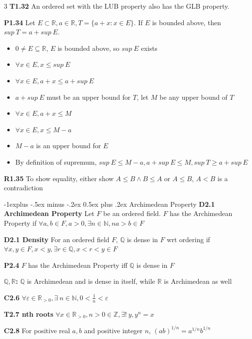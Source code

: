 \documentclass[10pt, landscape]{article}
\makeatletter
\renewcommand{\section}{\@startsection{section}{1}{0mm}%
                                {-1ex plus -.5ex minus -.2ex}%
                                {0.5ex plus .2ex}%
                                {\normalfont\large\bfseries}}
\renewcommand{\section}{\@startsection{section}{2}{0mm}%
                                {-1explus -.5ex minus -.2ex}%
                                {0.5ex plus .2ex}%
                                {\normalfont\normalsize\bfseries}}
\makeatother
\begin{document}
\begin{multicols*}{3}
\textbf{T1.32} An ordered set with the LUB property also has the GLB property.

\textbf{P1.34} Let $E \subset \mathbb{R}, a \in \mathbb{R}, T=\{a+x:x\in E\}$. If $E$ is bounded above, then $sup\ T=a+sup\ E$.
\begin{itemize}
    \item $0 \neq E \subseteq \mathbb{R}$, $E$ is bounded above, so $sup\ E$ exists
    \item $\forall x \in E, x \leq sup\ E$
    \item $\forall x \in E, a+x \leq a + sup\ E$
    \item $a+sup\ E$ must be an upper bound for $T$, let $M$ be any upper bound of $T$
    \item $\forall x \in E, a+x \leq M$
    \item $\forall x \in E, x \leq M-a$
    \item $M-a$ is an upper bound for $E$
    \item By definition of supremum, $sup\ E \leq M-a, a+sup\ E \leq M, sup\ T \geq a + sup\ E$
\end{itemize}

\textbf{R1.35} To show equality, either show $A \leq B \land B \leq A$ or $A \leq B$, $A<B$ is a contradiction

\section{Archimedean Property}
\textbf{D2.1 Archimedean Property} Let $F$ be an ordered field. $F$ has the Archimedean Property if $\forall a,b \in F, a > 0, \exists n \in \mathbb{N}, na > b \in F$

\textbf{D2.1 Density} For an ordered field $F$, $\mathbb{Q}$ is dense in $F$ wrt ordering if $\forall x, y \in F, x<y, \exists r \in \mathbb{Q}, x < r < y \in F$

\textbf{P2.4} $F$ has the Archimedean Property iff $\mathbb{Q}$ is dense in $F$

\textbf{$\mathbb{Q}, \mathbb{R}$:} $\mathbb{Q}$ is Archimedean and is dense in itself, while $\mathbb{R}$ is Archimedean as well

\textbf{C2.6} $\forall \varepsilon \in \mathbb{R}_{>0}, \exists\ n \in \mathbb{N}, 0 < \frac{1}{n} < \varepsilon$

\textbf{T2.7 nth roots} $\forall x \in  \mathbb{R}_{>0}, n > 0 \in \mathbb{Z}, \exists!\ y, y^n = x$

\textbf{C2.8} For positive real $a,b$ and positive integer $n$, $(ab)^{1/n}=a^{1/n}b^{1/n}$


\end{multicols*}
\end{document}
